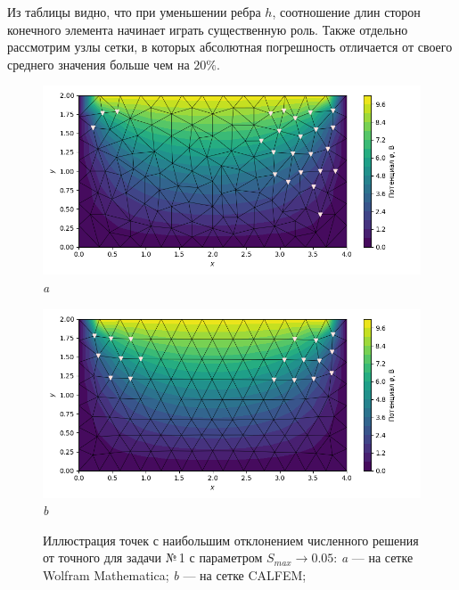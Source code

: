 \documentclass[12pt, a4paper]{article}
\begin{document}
			\vspace*{5mm}
			Из таблицы видно, что при уменьшении ребра $h$, соотношение длин сторон конечного элемента начинает играть существенную роль.			
			Также отдельно рассмотрим узлы сетки, в которых абсолютная погрешность отличается от своего среднего значения больше чем на $20\%$. 
			\vspace*{5mm}
			\begin{figure}[!h]  
				\centering     
				\vspace{5.0mm} 
				\begin{center} 
					{ 
						\begin{minipage}{0.45\textwidth} 
							\centering 
							\hspace*{-32.7mm}
							\includegraphics[width=1.4\columnwidth]{rect_dirichlet_only_005_err_nodes.png}\\ 
							\hspace*{-42.7mm}
							\textit{a} 
						\end{minipage}                                 
					} 
					{ 
						\begin{minipage}{0.45\textwidth} 
							\centering 
							\hspace*{-8.2mm}
							\includegraphics[width=1.4\columnwidth]{rect_dirichlet_only_005_calfem_err_nodes.png}\\ 
							\hspace*{2.2mm}
							\textit{b} 
						\end{minipage}                                 
					} 
									
				\end{center} 
				\vspace*{-0.0mm} 
				\caption{Иллюстрация точек с наибольшим отклонением численного решения от точного для задачи №\,1 с параметром $S_{max} \rightarrow 0.05$: 
					\textit{a} --- на сетке Wolfram Mathematica;
					\textit{b} --- на сетке CALFEM;
				} 
				\label{fig: max_err_005}
			\end{figure}
			
\end{document}
